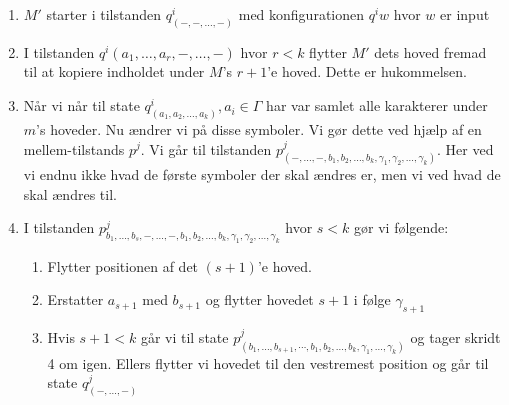 \begin{frame}[allowframebreaks]
\begin{itemize}
          \begin{enumerate}
            \item $M'$ starter i tilstanden $q^{i}_{(-,-, \ldots, -)}$ med konfigurationen $q^{i}w$ hvor $w$ er input
            \item I tilstanden $q^{i}(a_{1}, \ldots, a_{r}, -, \ldots, -)$ hvor $r < k$ flytter $M'$ dets hoved fremad til at kopiere indholdet under $M$'s $r+1$'e hoved. Dette er hukommelsen.
            \item Når vi når til state $q^{i}_{(a_{1}, a_{2}, \ldots, a_{k})}, a_{i} \in \Gamma$ har var samlet alle karakterer under $m$'s hoveder. Nu ændrer vi på disse symboler. Vi gør dette ved hjælp af en mellem-tilstands $p^{j}$. Vi går til tilstanden $p^{j}_{(-,\ldots,-,b_{1}, b_{2}, \ldots, b_{k}, \gamma_{1}, \gamma_{2}, \ldots, \gamma_{k})}$. Her ved vi endnu ikke hvad de første symboler der skal ændres er, men vi ved hvad de skal ændres til.
            \item I tilstanden $p^{j}_{b_{1}, \ldots, b_{s}, -, \ldots, -, b_{1}, b_{2}, \ldots, b_{k}, \gamma_{1}, \gamma_{2}, \ldots, \gamma_{k}}$ hvor $s < k$ gør vi følgende:
                  \begin{enumerate}
                    \item Flytter positionen af det $(s+1)$'e hoved.
                    \item Erstatter $a_{s+1}$ med $b_{s+1}$ og flytter hovedet $s+1$ i følge $\gamma_{s+1}$
                    \item Hvis $s+1 < k$ går vi til state $p^{j}_{(b_{1}, \ldots, b_{s+1}, \cdots, b_{1}, b_{2}, \ldots, b_{k}, \gamma_{1}, \ldots, \gamma_{k})}$ og tager skridt 4 om igen. Ellers flytter vi hovedet til den vestremest position og går til state $q^{j}_{(-, \ldots, -)}$
                  \end{enumerate}


\end{enumerate}
\end{itemize}
\end{frame}
